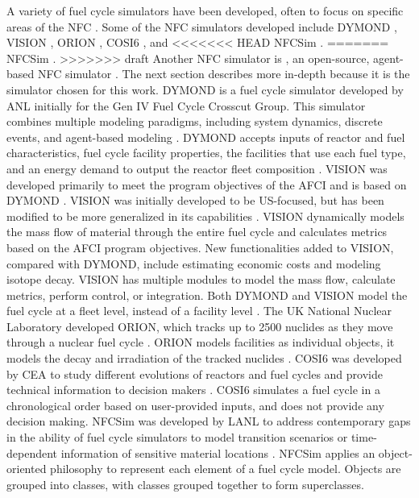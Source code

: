 A variety of fuel cycle simulators have been developed, often to focus on 
specific areas of the \gls{NFC} \cite{huff_next_2010}. Some of the 
\gls{NFC} simulators developed include
\gls{DYMOND} \cite{feng_sensitivity_2020,feng_standardized_2016}, 
\gls{VISION} \cite{yacout_visionverifiable_2006}, ORION 
\cite{gregg_analysis_2012}, COSI6 \cite{coquelet-pascal_cosi6:_2015}, and
<<<<<<< HEAD
\gls{NFCSim} \cite{schneider_nfcsim:_2005}.
=======
\gls{NFCSim} \cite{schneider_nfcsim:_2005}. 
>>>>>>> draft
Another \gls{NFC} simulator is \Cyclus, an open-source, agent-based 
\gls{NFC} simulator \cite{huff_fundamental_2016}. The next section 
describes \Cyclus more in-depth because it is the simulator chosen for this 
work. 
\gls{DYMOND} is a fuel cycle simulator developed by \gls{ANL} initially for 
the Gen IV Fuel Cycle Crosscut Group. This simulator combines 
multiple modeling paradigms, including system dynamics, discrete events, and
agent-based modeling \cite{feng_standardized_2016,feng_sensitivity_2020}.
\gls{DYMOND} accepts inputs of reactor and fuel characteristics, fuel cycle 
facility properties, the facilities that use each fuel type, and an 
energy demand to output the reactor fleet composition \cite{feng_standardized_2016}.
\gls{VISION} was developed primarily to meet the program objectives of the 
\gls{AFCI} and is based on \gls{DYMOND} \cite{yacout_visionverifiable_2006}.
\gls{VISION} was initially developed to be US-focused, but has been modified to 
be more generalized in its capabilities \cite{feng_standardized_2016}.
\gls{VISION} dynamically models the mass flow of material through the 
entire fuel cycle and calculates metrics based on the \gls{AFCI} program 
objectives. New functionalities added to \gls{VISION}, compared with \gls{DYMOND}, 
include estimating economic costs and modeling isotope decay. 
\gls{VISION} has multiple 
modules to model the mass flow, calculate metrics, perform control, or 
integration. 
Both \gls{DYMOND} and \gls{VISION} model the fuel cycle at a fleet level, 
instead of a facility level \cite{feng_standardized_2016}.  
The UK National Nuclear Laboratory developed ORION, which tracks up to 
2500 nuclides as they 
move through a nuclear fuel cycle \cite{gregg_analysis_2012}. ORION models
facilities as individual objects, it models
the decay and irradiation of the tracked nuclides 
\cite{feng_standardized_2016}. COSI6 was developed by \gls{CEA} to 
study different evolutions of reactors and fuel cycles and 
provide technical information to decision makers \cite{coquelet-pascal_cosi6:_2015}. 
COSI6 simulates a fuel 
cycle in a chronological order based on user-provided inputs, and does 
not provide any decision making. \gls{NFCSim} was developed by \gls{LANL}
to address contemporary gaps in the ability of fuel cycle simulators 
to model transition scenarios or time-dependent information of 
sensitive material locations \cite{schneider_nfcsim:_2005}. 
\gls{NFCSim} applies an object-oriented 
philosophy to represent each element of a fuel cycle model. Objects 
are grouped into classes, with classes grouped together to form 
superclasses. 

